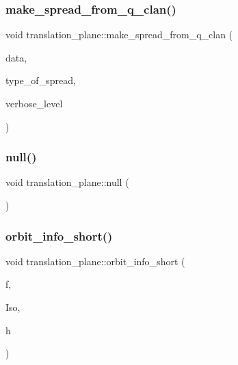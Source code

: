 \mbox{\label{classtranslation__plane_a2b5efeef289358c6e9ed6b73750bdc1a}} 
\subsubsection{\texorpdfstring{make\+\_\+spread\+\_\+from\+\_\+q\+\_\+clan()}{make\_spread\_from\_q\_clan()}}
{\footnotesize\ttfamily void translation\+\_\+plane\+::make\+\_\+spread\+\_\+from\+\_\+q\+\_\+clan (\begin{DoxyParamCaption}\item[{\mbox{\hyperlink{galois_8h_a09fddde158a3a20bd2dcadb609de11dc}{I\+NT}} $\ast$}]{data,  }\item[{\mbox{\hyperlink{galois_8h_a09fddde158a3a20bd2dcadb609de11dc}{I\+NT}}}]{type\+\_\+of\+\_\+spread,  }\item[{\mbox{\hyperlink{galois_8h_a09fddde158a3a20bd2dcadb609de11dc}{I\+NT}}}]{verbose\+\_\+level }\end{DoxyParamCaption})}

\mbox{\label{classtranslation__plane_abdb35dc7ca796051b5339a7947af67d9}} 
\subsubsection{\texorpdfstring{null()}{null()}}
{\footnotesize\ttfamily void translation\+\_\+plane\+::null (\begin{DoxyParamCaption}{ }\end{DoxyParamCaption})}

\mbox{\label{classtranslation__plane_a4743b2c286b814f16b9dbc284ba159a8}} 
\subsubsection{\texorpdfstring{orbit\+\_\+info\+\_\+short()}{orbit\_info\_short()}}
{\footnotesize\ttfamily void translation\+\_\+plane\+::orbit\+\_\+info\+\_\+short (\begin{DoxyParamCaption}\item[{ofstream \&}]{f,  }\item[{\mbox{\hyperlink{classisomorph}{isomorph}} \&}]{Iso,  }\item[{\mbox{\hyperlink{galois_8h_a09fddde158a3a20bd2dcadb609de11dc}{I\+NT}}}]{h }\end{DoxyParamCaption})}

